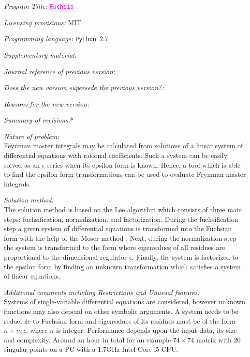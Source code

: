 \documentclass{elsarticle}
\newcommand{\eps}{\epsilon}
\newcommand{\fuchsia}{\textcolor{fuchsia}{\texttt{Fuchsia}}\xspace}
\newcommand{\python}{\texttt{Python}\xspace}
\begin{document}
\begin{small}
\noindent

{\em Program Title:}  \fuchsia

{\em Licensing provisions:} MIT                               

{\em Programming language:} \python~2.7

{\em Supplementary material:}

{\em Journal reference of previous version:}

{\em Does the new version supersede the previous version?:}

{\em Reasons for the new version:}

{\em Summary of revisions:}*

{\em Nature of problem:}\\
    Feynman master integrals may be calculated from solutions of a linear system of differential equations with rational coefficients.
    Such a system can be easily solved as an $\eps$-series when its epsilon form is known.
    Hence, a tool which is able to find the epsilon form transformations can be used to evaluate Feynman master integrals. 

{\em Solution method:}\\
    The solution method is based on the Lee algorithm \cite{Lee15} which consists of three main steps: fuchsification, normalization, and factorization.
    During the fuchsification step a given system of differential equations is transformed into the Fuchsian form with the help of the Moser method \cite{Mos59}.
    Next, during the normalization step the system is transformed to the form where eigenvalues of all residues are proportional to the dimensional regulator $\eps$.
    Finally, the system is factorized to the epsilon form by finding an unknown transformation which satisfies a system of linear equations.

{\em Additional comments including Restrictions and Unusual features:}\\
    Systems of single-variable differential equations are considered, however unknown functions may also depend on other symbolic arguments.
    A system needs to be reducible to Fuchsian form and eigenvalues of its residues must be of the form $n + m\,\eps$, where $n$ is integer.
    Performance depends upon the input data, its size and complexity.
    Around an hour in total for an example $74\times74$ matrix with 20 singular points on a PC with a 1.7GHz Intel Core i5 CPU.
   \\


\end{small}
\end{document}
